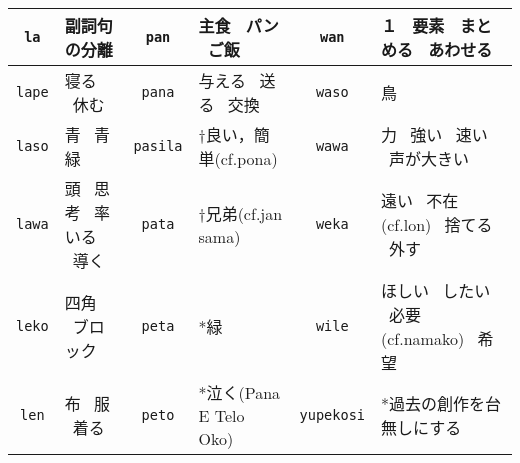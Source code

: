 \documentclass[a4paper,10pt,landscape]{article}
\begin{document}
{\begin{tabular}{|c|l||c|l||c|l|}
\hline \texttt{la} & 副詞句の分離  & \texttt{pan} & 主食  \  パン  \  ご飯  & \texttt{wan} & １  \  要素  \  まとめる  \  あわせる  \\
\hline \texttt{lape} & 寝る \ 休む  & \texttt{pana} & 与える  \  送る  \  交換  & \texttt{waso} & 鳥  \\
\hline \texttt{laso} & 青 \ 青緑  & \texttt{pasila} & †良い，簡単(cf.pona) & \texttt{wawa} & 力  \  強い  \  速い  \  声が大きい  \\
\hline \texttt{lawa} & 頭 \ 思考 \ 率いる \ 導く  & \texttt{pata} & †兄弟(cf.jan sama)  & \texttt{weka} & 遠い  \  不在(cf.lon)  \  捨てる  \  外す  \\
\hline \texttt{leko} & 四角 \ ブロック  & \texttt{peta} & *緑 & \texttt{wile} & ほしい  \  したい  \  必要(cf.namako)  \  希望  \\
\hline \texttt{len} & 布 \ 服 \ 着る  & \texttt{peto} & *泣く(Pana E Telo Oko) & \texttt{yupekosi} & *過去の創作を台無しにする \\
\hline
\end{tabular}
}
\end{document}
